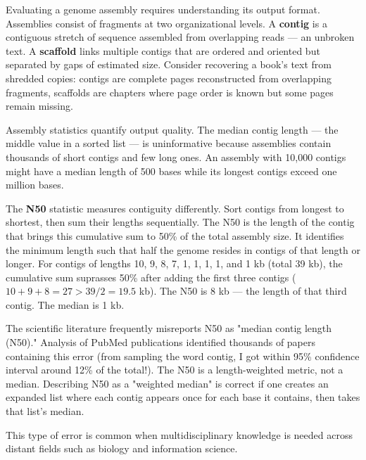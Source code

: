 \begin{commentary}
Evaluating a genome assembly requires understanding its output format. Assemblies consist of fragments at two organizational levels. A \textbf{contig} is a contiguous stretch of sequence assembled from overlapping reads — an unbroken text. A \textbf{scaffold} links multiple contigs that are ordered and oriented but separated by gaps of estimated size. Consider recovering a book's text from shredded copies: contigs are complete pages reconstructed from overlapping fragments, scaffolds are chapters where page order is known but some pages remain missing.

Assembly statistics quantify output quality. The median contig length — the middle value in a sorted list — is uninformative because assemblies contain thousands of short contigs and few long ones. An assembly with 10,000 contigs might have a median length of 500 bases while its longest contigs exceed one million bases.

The \textbf{N50} statistic measures contiguity differently. Sort contigs from longest to shortest, then sum their lengths sequentially. The N50 is the length of the contig that brings this cumulative sum to 50\% of the total assembly size. It identifies the minimum length such that half the genome resides in contigs of that length or longer. For contigs of lengths 10, 9, 8, 7, 1, 1, 1, 1, and 1 kb (total 39 kb), the cumulative sum suprasses 50\% after adding the first three contigs ($10+9+8=27>39/2=19.5$ kb). The N50 is 8 kb — the length of that third contig. The median is 1 kb.

The scientific literature frequently misreports N50 as "median contig length (N50)." Analysis of PubMed publications identified thousands of papers containing this error (from sampling the word contig, I got within 95\% confidence interval around 12\% of the total!). The N50 is a length-weighted metric, not a median. Describing N50 as a "weighted median" is correct if one creates an expanded list where each contig appears once for each base it contains, then takes that list's median.

This type of error is common when multidisciplinary knowledge is needed across distant fields such as biology and information science.
\end{commentary}

